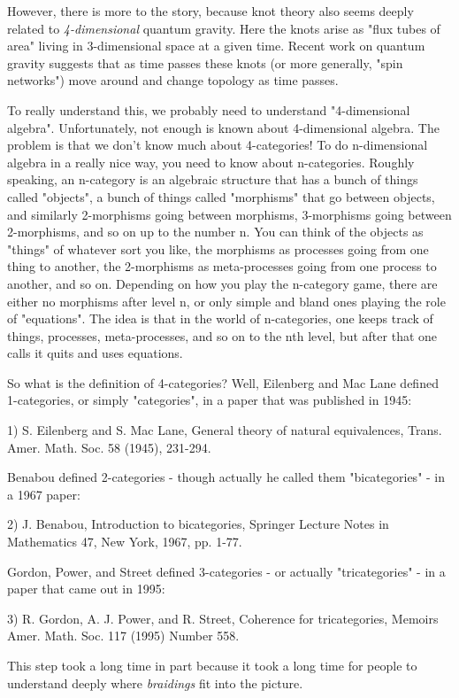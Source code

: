 However, there is more to the story, because knot theory also seems
deeply related to \emph{4-dimensional} quantum gravity.  Here the
knots arise as "flux tubes of area" living in 3-dimensional
space at a given time.  Recent work on quantum gravity suggests that as
time passes these knots (or more generally, "spin networks")
move around and change topology as time passes.

To really understand this, we probably need to understand
"4-dimensional algebra".  Unfortunately, not enough is known about
4-dimensional algebra.  The problem is that we don't know much about
4-categories!  To do n-dimensional algebra in a really nice way, you
need to know about n-categories.  Roughly speaking, an n-category is
an algebraic structure that has a bunch of things called "objects", a
bunch of things called "morphisms" that go between objects, and
similarly 2-morphisms going between morphisms, 3-morphisms going
between 2-morphisms, and so on up to the number n.  You can think of
the objects as "things" of whatever sort you like, the morphisms as
processes going from one thing to another, the 2-morphisms as
meta-processes going from one process to another, and so on.
Depending on how you play the n-category game, there are either no
morphisms after level n, or only simple and bland ones playing the
role of "equations".  The idea is that in the world of n-categories,
one keeps track of things, processes, meta-processes, and so on to the
nth level, but after that one calls it quits and uses equations.  

So what is the definition of 4-categories?  Well, Eilenberg and
Mac Lane defined 1-categories, or simply "categories", in a paper
that was published in 1945:

1) S. Eilenberg and S. Mac Lane, General theory of natural
equivalences, Trans. Amer. Math. Soc. 58 (1945), 231-294.

Benabou defined 2-categories - though actually he called them 
"bicategories" - in a 1967 paper:

2) J. Benabou, Introduction to bicategories, Springer Lecture Notes in
Mathematics 47, New York, 1967, pp. 1-77.

Gordon, Power, and Street defined 3-categories - or actually 
"tricategories" - in a paper that came out in 1995:

3) R. Gordon, A. J. Power, and R. Street, Coherence for tricategories,
Memoirs Amer. Math. Soc. 117 (1995) Number 558.

This step took a long time in part because it took a long time for
people to understand deeply where \emph{braidings} fit into the picture.

